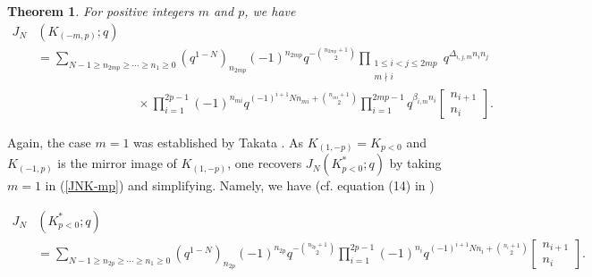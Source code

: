 \documentclass[11pt,reqno]{amsart}
\newtheorem{theorem}{Theorem}[section]
\theoremstyle{definition}
\numberwithin{equation}{section}
\begin{document}
\begin{theorem} \label{main2}
For positive integers $m$ and $p$, we have
\begin{equation} \label{JNK-mp}
\begin{aligned}
J_{N}&(K_{(-m,p)}; q) \\ 
&= \sum_{N-1 \geq n_{2mp} \geq \cdots \geq n_1 \geq 0} (q^{1-N})_{n_{2mp}}(-1)^{n_{2mp}} q^{-\binom{n_{2mp} + 1}{2}} \prod_{\substack{1 \leq i < j \leq 2mp \\ m \nmid i}} q^{\Delta_{i,j,m} n_i n_j} \\
& \qquad \qquad \qquad \qquad \times \prod_{i=1}^{2p-1} (-1)^{n_{mi}} q^{(-1)^{i+1} N n_{mi} + \binom{n_{mi} + 1}{2}} \prod_{i=1}^{2mp - 1} q^{\beta_{i,m} n_i}\begin{bmatrix} n_{i+1} \\ n_{i} \end{bmatrix}.
\end{aligned}
\end{equation}
\end{theorem}

Again, the case $m=1$ was established by Takata \cite{takata}.    As $K_{(1,-p)} = K_{p<0}$ and $K_{(-1,p)}$ is the mirror image of $K_{(1,-p)}$, one recovers $J_{N}(K_{p<0}^{*}; q)$ by taking $m=1$ in (\ref{JNK-mp}) and simplifying.  Namely, we have (cf. equation (14) in \cite{takata})

\begin{equation} \label{kpneg}
\begin{aligned}
J_{N}&(K_{p<0}^{*}; q) \\
& = \sum_{N-1 \geq n_{2p} \geq \cdots \geq n_1 \geq 0} (q^{1-N})_{n_{2p}} (-1)^{n_{2p}} q^{-\binom{n_{2p} + 1}{2}} \prod_{i=1}^{2p-1} (-1)^{n_{i}} q^{(-1)^{i+1} N n_{i} + \binom{n_{i} + 1}{2}} \begin{bmatrix} n_{i+1} \\ n_{i} \end{bmatrix}. 
\end{aligned}
\end{equation}
\end{document}
